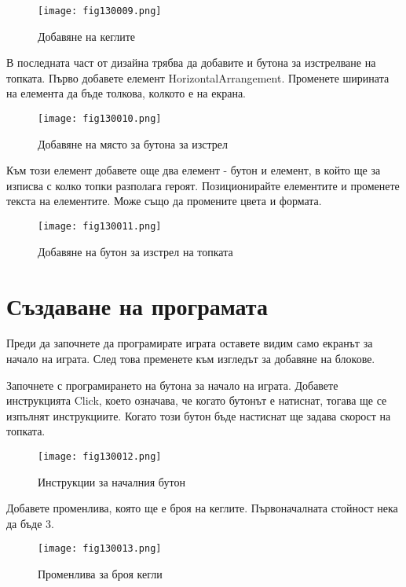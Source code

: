 \begin{figure}[H]
  \centering
  \texttt{[image: fig130009.png]}
  \caption{Добавяне на кеглите}
\label{fig130009}
\end{figure}

В последната част от дизайна трябва да добавите и бутона за изстрелване на топката. Първо добавете елемент HorizontalArrangement. Променете ширината на елемента да бъде толкова, колкото е на екрана.

\begin{figure}[H]
  \centering
  \texttt{[image: fig130010.png]}
  \caption{Добавяне на място за бутона за изстрел}
\label{fig130010}
\end{figure}

Към този елемент добавете още два елемент - бутон и елемент, в който ще за изписва с колко топки разполага героят. Позиционирайте елементите и променете текста на елементите. Може също да промените цвета и формата.

\begin{figure}[H]
  \centering
  \texttt{[image: fig130011.png]}
  \caption{Добавяне на бутон за изстрел на топката}
\label{fig130011}
\end{figure}

\section{Създаване на програмата}

Преди да започнете да програмирате играта оставете видим само екранът за начало на играта. След това пременете към изгледът за добавяне на блокове.

Започнете с програмирането на бутона за начало на играта. Добавете инструкцията Click, което означава, че когато бутонът е натиснат, тогава ще се изпълнят инструкциите. Когато този бутон бъде настиснат ще задава скорост на топката.

\begin{figure}[H]
  \centering
  \texttt{[image: fig130012.png]}
  \caption{Инструкции за началния бутон}
\label{fig130012}
\end{figure}

Добавете променлива, която ще е броя на кеглите. Първоначалната стойност нека да бъде 3.

\begin{figure}[H]
  \centering
  \texttt{[image: fig130013.png]}
  \caption{Променлива за броя кегли}
\label{fig130013}
\end{figure}


